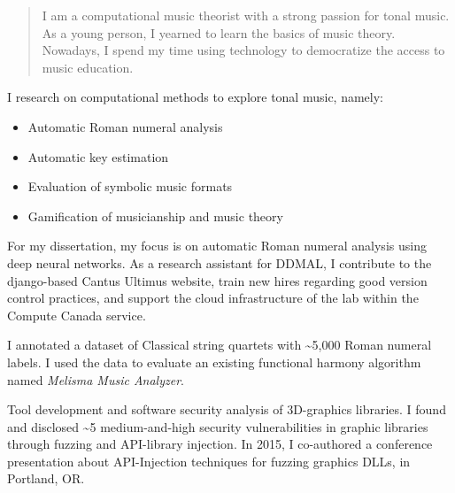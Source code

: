 \documentclass[10pt,a4paper,ragged2e,withhyper]{altacv}
\begin{document}
\begin{paracol}{2}

\begin{quote}
I am a computational music theorist with a strong passion for tonal music.
As a young person, I yearned to learn the basics of music theory.
Nowadays, I spend my time using technology to democratize the access to music education.
\end{quote}


I research on computational methods to explore tonal music, namely:
\begin{itemize}
    \item Automatic Roman numeral analysis \cite{napoles_lopez_augmentednet_2021, napoles_lopez_harmalysis_2020}
    \item Automatic key estimation \cite{napoles_lopez_key-finding_2019, napoles_lopez_local_2020}
    \item Evaluation of symbolic music formats \cite{napoles_lopez_encoding_2018, napoles_lopez_effects_2019}
    \item Gamification of musicianship and music theory \cite{napoles_lopez_-re-myth_2020, napoles_lopez_dandelot_2019}
\end{itemize}
For my dissertation, my focus is on automatic Roman numeral analysis using deep neural networks.
As a research assistant for DDMAL, I contribute to the django-based Cantus Ultimus website, train new hires regarding good version control practices, and support the cloud infrastructure of the lab within the Compute Canada service.

\medskip

I annotated a dataset of Classical string quartets with \textasciitilde{}5,000 Roman numeral labels. 
I used the data to evaluate an existing functional harmony algorithm named \emph{Melisma Music Analyzer}.

\medskip

Tool development and software security analysis of 3D-graphics libraries. 
I found and disclosed \textasciitilde{}5 medium-and-high security vulnerabilities in graphic libraries through fuzzing and API-library injection. 
In 2015, I co-authored a conference presentation about API-Injection techniques for fuzzing graphics DLLs, in Portland, OR.


\end{paracol}
\end{document}
